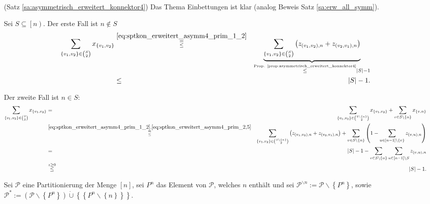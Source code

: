\documentclass[10p,a4paper,BCOR = 12mm, DIV=15]{scrbook}
\begin{document}
\begin{bew} (Satz \ref{sa:asymmetrisch_erweitert_konnektor4})
Das Thema Einbettungen ist klar (analog Beweis Satz \ref{sa:erw_all_symm}).

Sei $S \subseteq \left[n\right)$. Der erste Fall ist $n \notin S$
\begin{eqnarray*}
\sum_{\left\{v_1, v_2\right\} \in {S \choose 2}} x_{\left\{v_1, v_2\right\}} & \stackrel{\eqref{eq:sptkon_erweitert_asymm4_prim_1_2}}{\substack{= \\ \leq}} & \underbrace{\sum_{\left\{v_1, v_2\right\} \in {S \choose 2}} \left(z_{\left(v_1, v_2\right), n} + z_{\left(v_2, v_1\right), n}\right)}_{\stackrel{\textnormal{Prop. \ref{prop:asymmetrisch_erweitert_konnektor4}}}{\leq} \left|S\right| - 1} \\
& \leq & \left|S\right| - 1.
\end{eqnarray*}

Der zweite Fall ist $n \in S$:
\begin{eqnarray*}
\sum_{\left\{v_1, v_2\right\} \in {S \choose 2}} x_{\left\{v_1, v_2\right\}} & = & \sum_{\left\{v_1, v_2\right\} \in {S\backslash \left\{n\right\} \choose 2}} x_{\left\{v_1, v_2\right\}} + \sum_{v \in S\backslash \left\{n\right\}} x_{\left\{v, n\right\}} \\
& \stackrel{\eqref{eq:sptkon_erweitert_asymm4_prim_1_2}, \eqref{eq:sptkon_erweitert_asymm4_prim_2,5}}{\substack{= \\ \leq}} & \sum_{\left\{v_1, v_2\right\} \in {S\backslash \left\{n\right\} \choose 2}} \left(z_{\left(v_1, v_2\right), n} + z_{\left(v_2, v_1\right), n}\right) + \sum_{v \in S\backslash \left\{n\right\}} \left(1-\sum_{u\in[n-1]\backslash\left\{v\right\}} z_{\left(v, u\right), n}\right) \\
& = & \left|S\right| - 1 - \sum_{v \in S\backslash \left\{n\right\}} \sum_{u \in \left[n-1\right] \backslash S} z_{\left(v, u\right), n} \\
& \stackrel{z \geq 0}{\leq} & \left|S\right| - 1.
\end{eqnarray*}

Sei $\mathcal{P}$ eine Partitionierung der Menge $\left[n\right]$, sei $P^n$ das Element von $\mathcal{P}$, welches $n$ enthält und sei $\mathcal{P}^{\backslash n} := \mathcal{P} \backslash \left\{ P^n \right\}$, sowie $\mathcal{P}^* := \left(\mathcal{P} \backslash \left\{ P^n \right\}\right) \mathbin{\dot{\cup}} \left\{\left\{P^n \backslash \left\{n\right\}\right\}\right\}$.


\end{bew}
\end{document}
